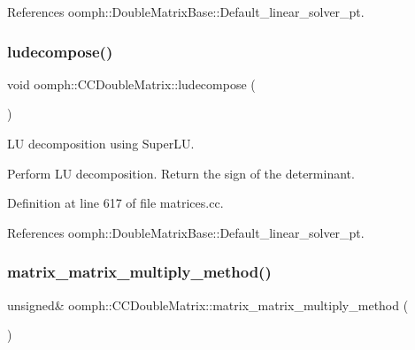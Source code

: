 References oomph\+::\+Double\+Matrix\+Base\+::\+Default\+\_\+linear\+\_\+solver\+\_\+pt.

\mbox{\label{classoomph_1_1CCDoubleMatrix_acb7c9b4e04b877b3ef40be905829eb41}} 
\subsubsection{\texorpdfstring{ludecompose()}{ludecompose()}}
{\footnotesize\ttfamily void oomph\+::\+C\+C\+Double\+Matrix\+::ludecompose (\begin{DoxyParamCaption}{ }\end{DoxyParamCaption})\hspace{0.3cm}{\ttfamily [virtual]}}



LU decomposition using Super\+LU. 

Perform LU decomposition. Return the sign of the determinant. 

Definition at line 617 of file matrices.\+cc.



References oomph\+::\+Double\+Matrix\+Base\+::\+Default\+\_\+linear\+\_\+solver\+\_\+pt.

\mbox{\label{classoomph_1_1CCDoubleMatrix_ac30e2e7873bf639f36494ab1b03e26d7}} 
\subsubsection{\texorpdfstring{matrix\+\_\+matrix\+\_\+multiply\+\_\+method()}{matrix\_matrix\_multiply\_method()}}
{\footnotesize\ttfamily unsigned\& oomph\+::\+C\+C\+Double\+Matrix\+::matrix\+\_\+matrix\+\_\+multiply\+\_\+method (\begin{DoxyParamCaption}{ }\end{DoxyParamCaption})\hspace{0.3cm}{\ttfamily [inline]}}



